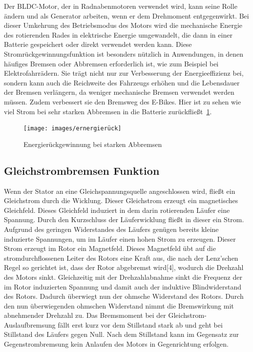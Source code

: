 Der BLDC-Motor, der in Radnabenmotoren verwendet wird, kann seine Rolle ändern und als Generator arbeiten, wenn er dem Drehmoment entgegenwirkt.
Bei dieser Umkehrung des Betriebsmodus des Motors wird die mechanische Energie des rotierenden Rades in elektrische Energie umgewandelt, die dann in einer Batterie gespeichert oder direkt verwendet werden kann.
Diese Stromrückgewinnungsfunktion ist besonders nützlich in Anwendungen, in denen häufiges Bremsen oder Abbremsen erforderlich ist, wie zum Beispiel bei Elektrofahrrädern.
Sie trägt nicht nur zur Verbesserung der Energieeffizienz bei, sondern kann auch die Reichweite des Fahrzeugs erhöhen und die Lebensdauer der Bremsen verlängern, da weniger mechanische Bremsen verwendet werden müssen.
Zudem verbessert sie den Bremsweg des E-Bikes.
Hier ist zu sehen wie viel Strom bei sehr starken Abbremsen in die Batterie zurückfließt~\ref{fig:38}.
\begin{figure}[h]
    \centering
    \texttt{[image: images/ernergierück]}
    \caption{Energierückgewinnung bei starken Abbremsen\cite{lorenz_scherrer_selbst_2023}}
    \label{fig:38}
\end{figure}

\subsection{Gleichstrombremsen Funktion}
Wenn der Stator an eine Gleichspannungsquelle angeschlossen wird, fließt ein Gleichstrom durch die Wicklung.
Dieser Gleichstrom erzeugt ein magnetisches Gleichfeld.
Dieses Gleichfeld induziert in dem darin rotierenden Läufer eine Spannung.
Durch den Kurzschluss der Läuferwicklung fließt in dieser ein Strom.
Aufgrund des geringen Widerstandes des Läufers genügen bereits kleine induzierte Spannungen, um im Läufer einen hohen Strom zu erzeugen.
Dieser Strom erzeugt im Rotor ein Magnetfeld.
Dieses Magnetfeld übt auf die stromdurchflossenen Leiter des Rotors eine Kraft aus, die nach der Lenz'schen Regel so gerichtet ist, dass der Rotor abgebremst wird[4], wodurch die Drehzahl des Motors sinkt.
Gleichzeitig mit der Drehzahlabnahme sinkt die Frequenz der im Rotor induzierten Spannung und damit auch der induktive Blindwiderstand des Rotors.
Dadurch überwiegt nun der ohmsche Widerstand des Rotors.
Durch den nun überwiegenden ohmschen Widerstand nimmt die Bremswirkung mit abnehmender Drehzahl zu.
Das Bremsmoment bei der Gleichstrom-Auslaufbremsung fällt erst kurz vor dem Stillstand stark ab und geht bei Stillstand des Läufers gegen Null.
Nach dem Stillstand kann im Gegensatz zur Gegenstrombremsung kein Anlaufen des Motors in Gegenrichtung erfolgen.

